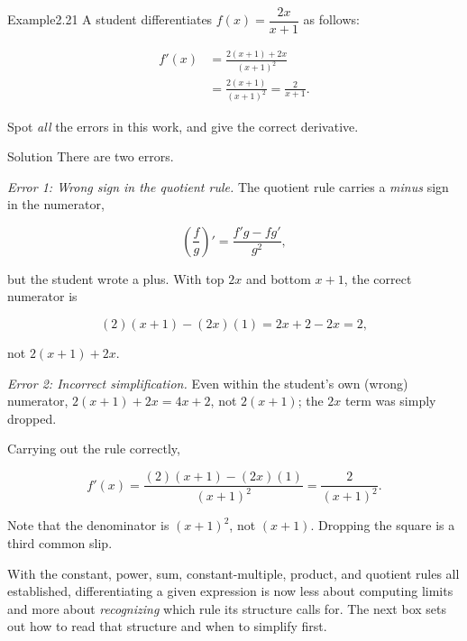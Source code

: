 \documentclass[a4paper,12pt,oneside]{memoir}
\begin{document}
\begin{workedexample}
\begin{envexample}{Example}{2.21}{}
A student differentiates \(f(x) = \dfrac{2x}{x + 1}\) as follows:

\[ \begin{aligned}
          f'(x) &= \frac{2(x + 1) + 2x}{(x + 1)^{2}} \\[4pt]
                &= \frac{2(x + 1)}{(x + 1)^{2}} = \frac{2}{x + 1}.
        \end{aligned} \]

Spot \emph{all} the errors in this work, and give the correct derivative.
\end{envexample}
\begin{envsolution}{Solution}{}{}
There are two errors.

\emph{Error 1: Wrong sign in the quotient rule.} The quotient rule carries a \emph{minus} sign in the numerator,

\[ \left(\frac{f}{g}\right)' = \frac{f'g - fg'}{g^{2}}, \]

but the student wrote a plus. With top \(2x\) and bottom \(x + 1\), the correct numerator is

\[ (2)(x + 1) - (2x)(1) = 2x + 2 - 2x = 2, \]

not \(2(x + 1) + 2x\).

\emph{Error 2: Incorrect simplification.} Even within the student’s own (wrong) numerator, \(2(x + 1) + 2x = 4x + 2\), not \(2(x + 1)\); the \(2x\) term was simply dropped.

Carrying out the rule correctly,

\[ f'(x) = \frac{(2)(x + 1) - (2x)(1)}{(x + 1)^{2}} = \frac{2}{(x + 1)^{2}}. \]

Note that the denominator is \((x + 1)^{2}\), not \((x + 1)\). Dropping the square is a third common slip.
\end{envsolution}
\end{workedexample}
With the constant, power, sum, constant-multiple, product, and quotient rules all established, differentiating a given expression is now less about computing limits and more about \emph{recognizing} which rule its structure calls for. The next box sets out how to read that structure and when to simplify first.
\end{document}
